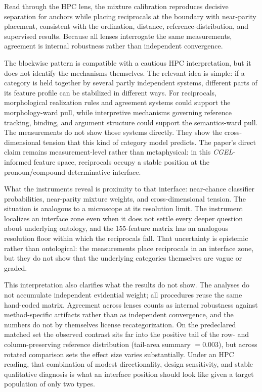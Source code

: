 \documentclass[12pt]{article}
\begin{document}
Read through the HPC lens, the mixture calibration reproduces decisive separation for anchors while placing reciprocals at the boundary with near-parity placement, consistent with the ordination, distance, reference-distribution, and supervised results. Because all lenses interrogate the same measurements, agreement is internal robustness rather than independent convergence.

The blockwise pattern is compatible with a cautious HPC interpretation, but it does not identify the mechanisms themselves. The relevant idea is simple: if a category is held together by several partly independent systems, different parts of its feature profile can be stabilized in different ways. For reciprocals, morphological realization rules and agreement systems could support the morphology-ward pull, while interpretive mechanisms governing reference tracking, binding, and argument structure could support the semantics-ward pull. The measurements do not show those systems directly. They show the cross-dimensional tension that this kind of category model predicts. The paper's direct claim remains measurement-level rather than metaphysical: in this \textit{CGEL}-informed feature space, reciprocals occupy a stable position at the pronoun/compound-determinative interface.

What the instruments reveal is proximity to that interface: near-chance classifier probabilities, near-parity mixture weights, and cross-dimensional tension. The situation is analogous to a microscope at its resolution limit. The instrument localizes an interface zone even when it does not settle every deeper question about underlying ontology, and the 155-feature matrix has an analogous resolution floor within which the reciprocals fall. That uncertainty is epistemic rather than ontological: the measurements place reciprocals in an interface zone, but they do not show that the underlying categories themselves are vague or graded.

This interpretation also clarifies what the results do not show. The analyses do not accumulate independent evidential weight; all procedures reuse the same hand-coded matrix. Agreement across lenses counts as internal robustness against method-specific artifacts rather than as independent convergence, and the numbers do not by themselves license recategorization. On the predeclared matched set the observed contrast sits far into the positive tail of the row- and column-preserving reference distribution (tail-area summary \(= 0.003\)), but across rotated comparison sets the effect size varies substantially. Under an HPC reading, that combination of modest directionality, design sensitivity, and stable qualitative diagnosis is what an interface position should look like given a target population of only two types.
\end{document}
